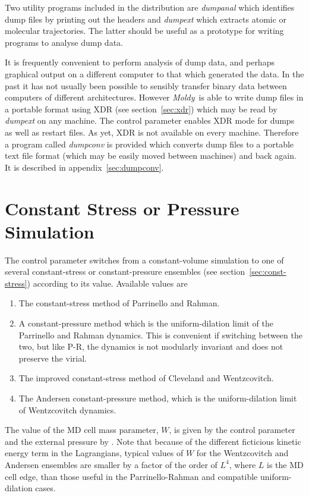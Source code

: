 \documentclass[a4paper,twoside]{report}
\newcommand{\moldy}{\emph{Moldy}}
\begin{document}
Two utility programs included in the distribution are \emph{dumpanal}
which identifies dump files by printing out the headers and
\emph{dumpext} which extracts atomic or molecular trajectories.  The
latter should be useful as a prototype for writing programs to analyse
dump data.

It is frequently convenient to perform analysis of dump data, and
perhaps graphical output on a different computer to that which
generated the data.  In the past it has not usually been possible to
sensibly transfer binary data between computers of different
architectures.  However \moldy\ is able to write dump files in a
portable format using XDR (see section~\ref{sec:xdr}) which may be
read by \emph{dumpext} on any machine.  The control parameter
 enables XDR mode for dumps as well as restart files.
As yet, XDR is not available on every machine.  Therefore a program
called \emph{dumpconv} is provided which converts dump files to a
portable text file format (which may be easily moved between machines)
and back again. It is described in appendix~\ref{sec:dumpconv}.


\section{Constant Stress or Pressure Simulation}%

The control parameter  switches from a
constant-volume simulation to one of several con\-stant-stress or
constant-pressure ensembles (see section~\ref{sec:const-stress})
according to its value.  Available values are
\begin{enumerate}
\item The constant-stress method of Parrinello and
  Rahman\cite{parrinello:81}.
\item A constant-pressure method which is the uniform-dilation limit
  of the Parrinello and Rahman dynamics.  This is convenient if
  switching between the two, but like P-R, the dynamics is not
  modularly invariant and does not preserve the virial.
\item The improved constant-stress method of
  Cleveland\cite{cleveland:88} and Wentzcovitch\cite{wentzcovitch:91}.
\item The Andersen constant-pressure method\cite{andersen:80}, which is the
  uniform-dilation limit of Wentzcovitch dynamics.
\end{enumerate}
The value of the MD cell mass parameter, $W$, is given by the control
parameter  and the external pressure by .  Note
that because of the different ficticious kinetic energy term in the
Lagrangians, typical values of $W$ for the Wentzcovitch and Andersen
ensembles are smaller by a factor of the order of $L^4$, where $L$ is
the MD cell edge, than those useful in the Parrinello-Rahman and
compatible uniform-dilation cases.
\end{document}
